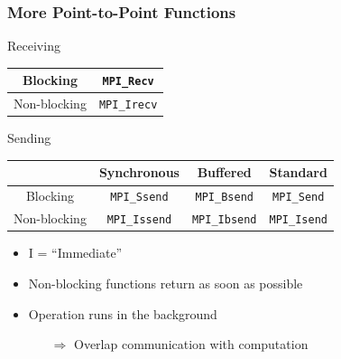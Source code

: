 \documentclass[xcolor={x11names,svgnames,psnames}]{beamer}
\begin{document}
\begin{frame}[fragile]
  \frametitle{More Point-to-Point Functions}

  \begin{exampleblock}{Receiving}
    \begin{center}
    \begin{tabular}{|c||c|}
    \hline
    Blocking     & \texttt{MPI_Recv}   \\
    \hline
    Non-blocking & \texttt{MPI_Irecv}  \\
    \hline
    \end{tabular}
  \end{center}
\end{exampleblock}

\pause
  
  \begin{alertblock}{Sending}
    \begin{center}
      \begin{tabular}{|c||c|c|c|}
    \hline
                 & Synchronous                 & Buffered                  & Standard \\
    \hline\hline
    Blocking     & \texttt{MPI_Ssend}   & \texttt{MPI_Bsend} & \texttt{MPI_Send}    \\
    \hline
    Non-blocking & \texttt{MPI_Issend}  & \texttt{MPI_Ibsend} & \texttt{MPI_Isend}  \\
    \hline
    \end{tabular}
    \end{center}
  \end{alertblock}

  \begin{itemize}
  \item I = ``Immediate''
  \item Non-blocking functions return as soon as possible
  \item Operation runs \alert{in the background}
    \begin{itemize}
    \item[$\Rightarrow$] Overlap communication with computation
    \end{itemize}
  \end{itemize}
  
\end{frame}

\end{document}
